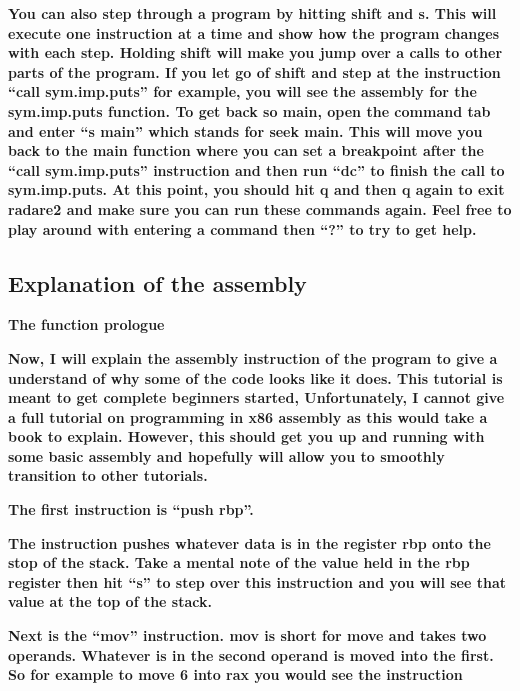 \documentclass[letterpaper]{article}
\newcommand{\sitfig}[3]{
\begin{figure}[H]
\centering
\makebox[\textwidth][c]{
#2
}
\label{#1}
\end{figure}
}
\newcommand{\sitgfx}[4][scale=1.0]{
\sitfig{#3}{\texttt{[image: \#2]}}{#4}
}
\begin{document}
\textbf{You can also step through a program by hitting shift and s. This will execute one instruction at a time and show
how the program changes with each step. Holding shift will make you jump over a calls to other parts of the program. If
you let go of shift and step at the instruction ``call sym.imp.puts'' for example, you will see the assembly for the
sym.imp.puts function. To get back so main, open the command tab and enter ``s main'' which stands for seek main. This
will move you back to the main function where you can set a breakpoint after the ``call sym.imp.puts'' instruction and
then run ``dc'' to finish the call to sym.imp.puts. At this point, you should hit q and then q again to exit radare2
and make sure you can run these commands again. Feel free to play around with entering a command then ``?'' to try to
get help.}

\subsection{Explanation of the assembly}

\textbf{The function prologue}

\textbf{Now, I will explain the assembly instruction of the program to give a understand of why some of the code looks
like it does. This tutorial is meant to get complete beginners started, Unfortunately, I cannot give a full tutorial on
programming in x86 assembly as this would take a book to explain. However, this should get you up and running with some
basic assembly and hopefully will allow you to smoothly transition to other tutorials.}

\textbf{The first instruction is ``push rbp''.}

  
\sitgfx[width=5.8335in,height=0.7035in]{FINALWORKINGDOCFORMERLYPRECURSOR-img086.png}{fig:unk}{TODO CAPTION}
 

\textbf{The instruction pushes whatever data is in the register rbp onto the stop of the stack. Take a mental note of
the value held in the rbp register then hit ``s'' to step over this instruction and you will see that value at the top
of the stack.}

  
\sitgfx[width=5.8335in,height=3.6457in]{FINALWORKINGDOCFORMERLYPRECURSOR-img087.png}{fig:unk}{TODO CAPTION}
 

\textbf{Next is the ``mov'' instruction. mov is short for move and takes two operands. Whatever is in the second operand
is moved into the first. So for example to move 6 into rax you would see the instruction}
\end{document}
